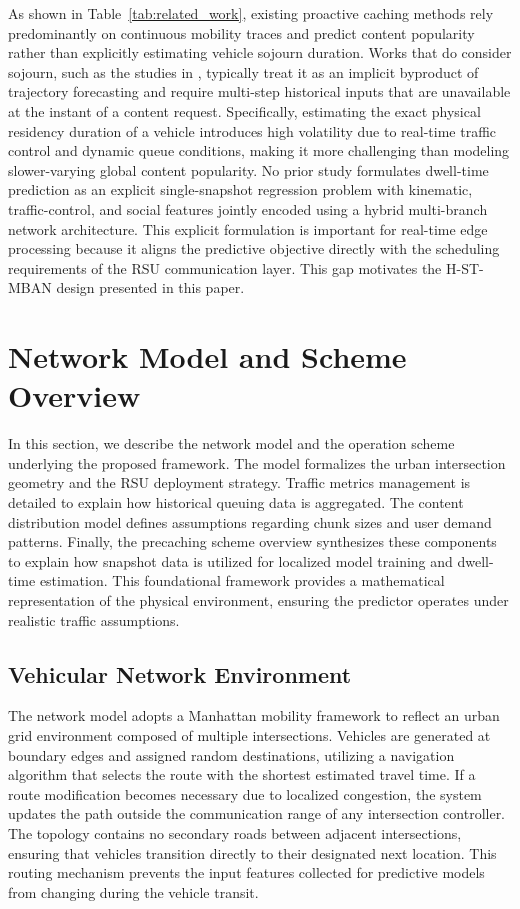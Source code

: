 \documentclass[journal]{IEEEtran}
\begin{document}
As shown in Table~\ref{tab:related_work}, existing proactive caching methods rely predominantly on continuous mobility traces and predict content popularity rather than explicitly estimating vehicle sojourn duration.
Works that do consider sojourn, such as the studies in \cite{feng2023, wang2025, nam2025}, typically treat it as an implicit byproduct of trajectory forecasting and require multi-step historical inputs that are unavailable at the instant of a content request.
Specifically, estimating the exact physical residency duration of a vehicle introduces high volatility due to real-time traffic control and dynamic queue conditions, making it more challenging than modeling slower-varying global content popularity.
No prior study formulates dwell-time prediction as an explicit single-snapshot regression problem with kinematic, traffic-control, and social features jointly encoded using a hybrid multi-branch network architecture.
This explicit formulation is important for real-time edge processing because it aligns the predictive objective directly with the scheduling requirements of the RSU communication layer.
This gap motivates the H-ST-MBAN design presented in this paper.

\section{Network Model and Scheme Overview} \label{sec:system}
In this section, we describe the network model and the operation scheme underlying the proposed framework. The model formalizes the urban intersection geometry and the RSU deployment strategy. Traffic metrics management is detailed to explain how historical queuing data is aggregated. The content distribution model defines assumptions regarding chunk sizes and user demand patterns. Finally, the precaching scheme overview synthesizes these components to explain how snapshot data is utilized for localized model training and dwell-time estimation. This foundational framework provides a mathematical representation of the physical environment, ensuring the predictor operates under realistic traffic assumptions.

\subsection{Vehicular Network Environment} \label{sec.net.A}
The network model adopts a Manhattan mobility framework to reflect an urban grid environment composed of multiple intersections. Vehicles are generated at boundary edges and assigned random destinations, utilizing a navigation algorithm that selects the route with the shortest estimated travel time. If a route modification becomes necessary due to localized congestion, the system updates the path outside the communication range of any intersection controller. The topology contains no secondary roads between adjacent intersections, ensuring that vehicles transition directly to their designated next location. This routing mechanism prevents the input features collected for predictive models from changing during the vehicle transit.
\end{document}
